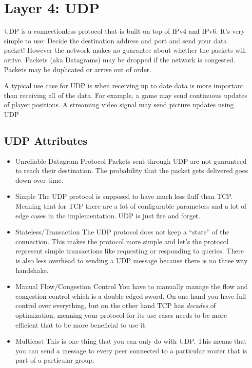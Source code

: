 \section{Layer 4: UDP}

UDP is a connectionless protocol that is built on top of IPv4 and IPv6.
It's very simple to use: Decide the destination address and port and send your data packet! However the network makes no guarantee about whether the packets will arrive.
Packets (aka Datagrams) may be dropped if the network is congested.
Packets may be duplicated or arrive out of order.

A typical use case for UDP is when receiving up to date data is more important than receiving all of the data.
For example, a game may send continuous updates of player positions.
A streaming video signal may send picture updates using UDP

\subsection{UDP Attributes}

\begin{itemize}
  \tightlist
\item Unreliable Datagram Protocol
  Packets sent through UDP are not guaranteed to reach their destination. The probability that the packet gets delivered goes down over time.
\item Simple
  The UDP protocol is supposed to have much less fluff than TCP.
  Meaning that for TCP there are a lot of configurable parameters and a lot of edge cases in the implementation.
  UDP is just fire and forget.
\item Stateless/Transaction
  The UDP protocol does not keep a ``state'' of the connection.
  This makes the protocol more simple and let's the protocol represent simple transactions like requesting or responding to queries.
  There is also less overhead to sending a UDP message because there is no three way handshake.
\item Manual Flow/Congestion Control
  You have to manually manage the flow and congestion control which is a double edged sword.
  On one hand you have full control over everything, but on the other hand TCP has \textit{decades} of optimization, meaning your protocol for its use cases needs to be more efficient that to be more beneficial to use it.
\item Multicast
  This is one thing that you can only do with UDP.
  This means that you can send a message to every peer connected to a particular router that is part of a particular group.
\end{itemize}

